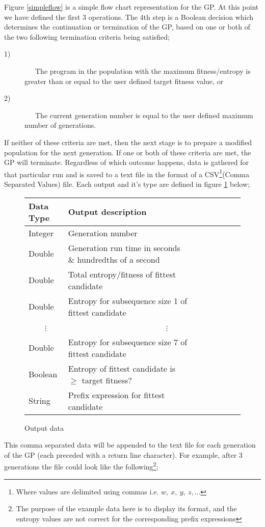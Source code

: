 \documentclass[a4paper,10.5pt]{article}
\begin{document}
Figure \ref{simpleflow} is a simple flow chart representation for the GP. At this point we have defined the first 3 operations. The 4th step is a Boolean decision which determines the continuation or termination of the GP, based on one or both of the two following termination criteria being satisfied;
\begin{description}
  \item[1)]
  \ \ \ The program in the population with the maximum fitness/entropy is greater than or equal to the user defined target fitness value, or
  \item[2)]
 \ \ \ The current generation number is equal to the user defined maximum number of generations.
\end{description}

If neither of these criteria are met, then the next stage is to prepare a modified population for the next generation. If one or both of these criteria are met, the GP will terminate. Regardless of which outcome happens, data is gathered for that particular run and is saved to a text file in the format of a CSV\footnote{Where values are delimited using commas i.e. $w,\ x,\ y,\ z, ...$}(Comma Separated Values) file. Each output and it's type are defined in figure \ref{outputparam} below;

\begin{figure}[H]
\centering
\caption{Output data}
\label{outputparam}
\begin{tabular}{l*{6}{l}r}
Data Type             & Output description\\
\hline
Integer & Generation number\\
Double & Generation run time in seconds \& hundredths of a second \\
Double & Total entropy/fitness of fittest candidate\\
Double & Entropy for subsequence size 1 of fittest candidate\\
\ \ \ \ $\vdots$ & \ \ \ \ \ \ \ \ \ \ \ \ \ \ \ \ \ \ \ \ \ \ \ \ $\vdots$\\
Double & Entropy for subsequence size 7 of fittest candidate\\
Boolean & Entropy of fittest candidate is $\geq$ target fitness?\\
String & Prefix expression for fittest candidate\\
\end{tabular}
\end{figure}

\begin{text}
This comma separated data will be appended to the text file for each generation of the GP (each preceded with a return line character). For example, after 3 generations the file could look like the following\footnote{The purpose of the example data here is to display its format, and the entropy values are not correct for the corresponding prefix expressions};
\end{text}
\end{document}
